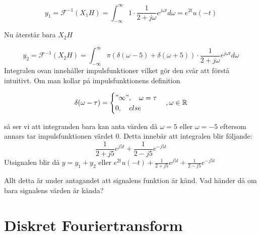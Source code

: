 \documentclass{article}
\begin{document}
\begin{displaymath}
  y_1 = \mathcal{F}^{-1}(X_1 H)
  = \int_{-\infty}^{\infty} 1 \cdot \frac{1}{2+j \omega} e^{j \omega t} d\omega
  = e^{2 t} u(-t)
\end{displaymath}

Nu återstår bara $X_2 H$

\begin{displaymath}
  y_2=\mathcal{F}^{-1}(X_2 H) = \int_{-\infty}^{\infty} \pi(\delta(\omega - 5)
  + \delta(\omega + 5)) \cdot \frac{1}{2+j \omega} e^{j \omega t} d\omega
\end{displaymath}
Integralen ovan innehåller impulsfunktioner vilket gör den svår att förstå
intuitivt. Om man kollar på impulsfunktionens definition

\begin{displaymath}
\delta(\omega - \tau)=
\begin{cases}
"\infty",\quad \omega = \tau \\
0, \quad else
\end{cases}, \omega \in \mathbb{R}
\end{displaymath}

så ser vi att integranden bara kan anta värden då $\omega=5$ eller $\omega =-5$
eftersom annars tar impulsfunktionen värdet 0.
Detta innebär att integralen blir följande:
\begin{displaymath}
  \frac{1}{2+j 5} e^{j 5 t} + \frac{1}{2-j 5} e^{-j 5 t}
\end{displaymath}
Utsignalen blir då $y=y_1 + y_2$ eller
$e^{2 t} u(-t) + \frac{1}{2+j 5} e^{j 5 t} + \frac{1}{2-j 5} e^{-j 5 t}$

Allt detta är under antagandet att signalens funktion är känd.
Vad händer då om bara signalens värden är kända?

\section{Diskret Fouriertransform}
\end{document}
